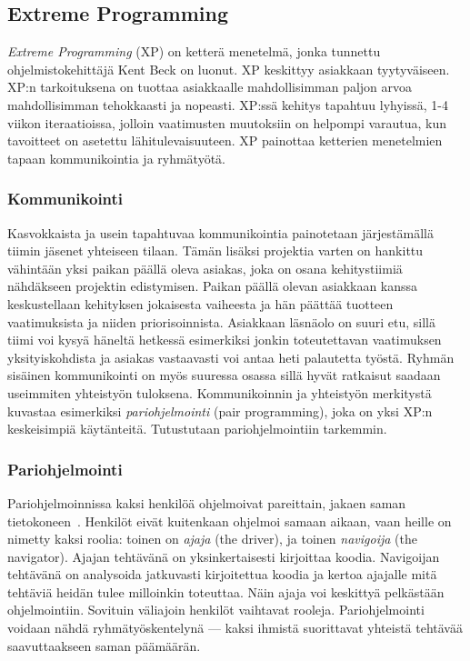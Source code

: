 \documentclass[finnish]{../tktltiki2}
\theoremstyle{definition}
\theoremstyle{remark}
\begin{document}
\subsection{Extreme Programming}

\emph{Extreme Programming} (XP) on ketterä menetelmä, jonka tunnettu 
ohjelmistokehittäjä Kent Beck on luonut. XP keskittyy asiakkaan tyytyväiseen. XP:n tarkoituksena on tuottaa 
asiakkaalle mahdollisimman paljon arvoa mahdollisimman tehokkaasti ja nopeasti.
XP:ssä kehitys tapahtuu lyhyissä, 1-4 viikon iteraatioissa, jolloin vaatimusten 
muutoksiin on helpompi varautua, kun tavoitteet on asetettu 
lähitulevaisuuteen. XP painottaa ketterien menetelmien tapaan kommunikointia ja ryhmätyötä.

\subsubsection{Kommunikointi}

Kasvokkaista ja usein tapahtuvaa kommunikointia painotetaan järjestämällä tiimin jäsenet yhteiseen tilaan. Tämän lisäksi projektia varten on hankittu vähintään yksi paikan päällä oleva asiakas, joka on osana kehitystiimiä nähdäkseen projektin edistymisen. Paikan päällä olevan asiakkaan kanssa keskustellaan kehityksen jokaisesta vaiheesta ja hän päättää tuotteen vaatimuksista ja niiden priorisoinnista. Asiakkaan läsnäolo on suuri etu, sillä tiimi voi kysyä häneltä hetkessä esimerkiksi jonkin toteutettavan vaatimuksen yksityiskohdista ja asiakas vastaavasti voi antaa heti palautetta työstä. Ryhmän sisäinen kommunikointi on myös suuressa osassa sillä hyvät ratkaisut saadaan useimmiten yhteistyön tuloksena. Kommunikoinnin ja yhteistyön merkitystä kuvastaa esimerkiksi \emph{pariohjelmointi} (pair 
programming), joka on yksi XP:n keskeisimpiä käytänteitä.
Tutustutaan pariohjelmointiin tarkemmin.

\subsubsection{Pariohjelmointi}

Pariohjelmoinnissa kaksi henkilöä ohjelmoivat pareittain, jakaen saman 
tietokoneen~\cite{Shore:2007:AAD:1407480}. Henkilöt eivät kuitenkaan ohjelmoi samaan aikaan, vaan 
heille on 
nimetty kaksi roolia: toinen on \emph{ajaja} (the driver), ja toinen 
\emph{navigoija} (the navigator). Ajajan tehtävänä on 
yksinkertaisesti 
kirjoittaa koodia. Navigoijan tehtävänä on analysoida jatkuvasti 
kirjoitettua koodia ja kertoa ajajalle mitä tehtäviä heidän tulee 
milloinkin 
toteuttaa. Näin ajaja voi keskittyä pelkästään ohjelmointiin. Sovituin 
väliajoin henkilöt vaihtavat rooleja. Pariohjelmointi voidaan nähdä 
ryhmätyöskentelynä --- kaksi ihmistä suorittavat yhteistä tehtävää 
saavuttaakseen saman päämäärän.\\
\end{document}
